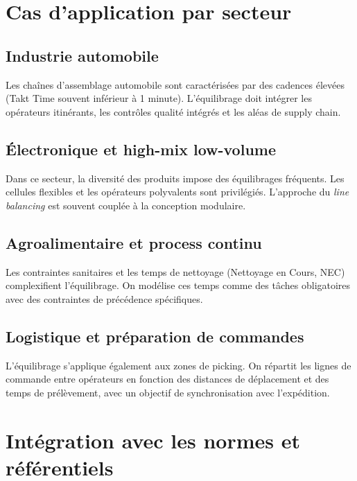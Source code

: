 \documentclass[12pt,a4paper]{article}
\begin{document}
\begin{center}
\section{Cas d’application par secteur}

\subsection{Industrie automobile}
Les chaînes d’assemblage automobile sont caractérisées par des cadences élevées (Takt Time souvent inférieur à 1 minute). L’équilibrage doit intégrer les opérateurs itinérants, les contrôles qualité intégrés et les aléas de supply chain.

\subsection{Électronique et high-mix low-volume}
Dans ce secteur, la diversité des produits impose des équilibrages fréquents. Les cellules flexibles et les opérateurs polyvalents sont privilégiés. L’approche du \textit{line balancing} est souvent couplée à la conception modulaire.

\subsection{Agroalimentaire et process continu}
Les contraintes sanitaires et les temps de nettoyage (Nettoyage en Cours, NEC) complexifient l’équilibrage. On modélise ces temps comme des tâches obligatoires avec des contraintes de précédence spécifiques.

\subsection{Logistique et préparation de commandes}
L’équilibrage s’applique également aux zones de picking. On répartit les lignes de commande entre opérateurs en fonction des distances de déplacement et des temps de prélèvement, avec un objectif de synchronisation avec l’expédition.


\section{Intégration avec les normes et référentiels}


\end{center}
\end{document}
